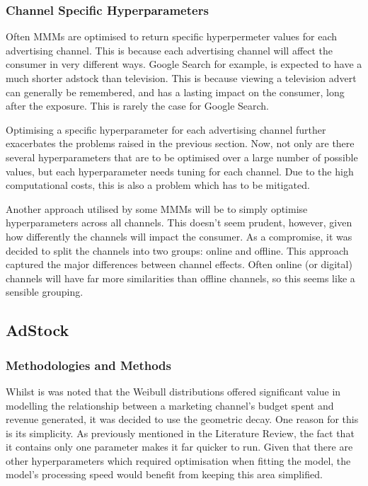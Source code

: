 \documentclass[11pt, a4paper]{article}
\begin{document}
\subsubsection*{Channel Specific Hyperparameters}

Often MMMs are optimised to return specific hyperpermeter values for each advertising channel. This is because each advertising channel will affect the consumer in very different ways. Google Search for example, is expected to have a much shorter adstock than television. This is because viewing a television advert can generally be remembered, and has a lasting impact on the consumer, long after the exposure. This is rarely the case for Google Search. 

Optimising a specific hyperparameter for each advertising channel further exacerbates the problems raised in the previous section. Now, not only are there several hyperparameters that are to be optimised over a large number of possible values, but each hyperparameter needs tuning for each channel. Due to the high computational costs, this is also a problem which has to be mitigated. 

Another approach utilised by some MMMs will be to simply optimise hyperparameters across all channels. This doesn’t seem prudent, however, given how differently the channels will impact the consumer. As a compromise, it was decided to split the channels into two groups: online and offline. This approach captured the major differences between channel effects. Often online (or digital) channels will have far more similarities than offline channels, so this seems like a sensible grouping. 

\subsection{AdStock}

\subsubsection{Methodologies and Methods}

Whilst is was noted that the Weibull distributions offered significant value in modelling the relationship between a marketing channel’s budget spent and revenue generated, it was decided to use the geometric decay. One reason for this is its simplicity. As previously mentioned in the Literature Review, the fact that it contains only one parameter makes it far quicker to run. Given that there are other hyperparameters which required optimisation when fitting the model, the model’s processing speed would benefit from keeping this area simplified.
\end{document}
